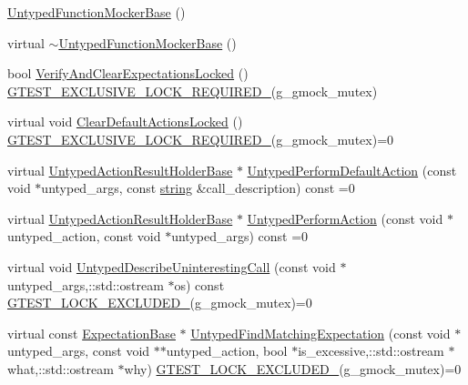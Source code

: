 \begin{DoxyCompactItemize}
\item 
\hyperlink{classtesting_1_1internal_1_1_untyped_function_mocker_base_aedfa95e65d80936e4dff040140513b36}{Untyped\+Function\+Mocker\+Base} ()
\item 
virtual \hyperlink{classtesting_1_1internal_1_1_untyped_function_mocker_base_a6badd47a3fe2a439ef98aa91bf73d721}{$\sim$\+Untyped\+Function\+Mocker\+Base} ()
\item 
bool \hyperlink{classtesting_1_1internal_1_1_untyped_function_mocker_base_a3f1d62a1662a3daa2895b3af963be269}{Verify\+And\+Clear\+Expectations\+Locked} () \hyperlink{gtest-port_8h_a149f693bd59fa1bc937af54c0cdcb32f}{G\+T\+E\+S\+T\+\_\+\+E\+X\+C\+L\+U\+S\+I\+V\+E\+\_\+\+L\+O\+C\+K\+\_\+\+R\+E\+Q\+U\+I\+R\+E\+D\+\_\+}(g\+\_\+gmock\+\_\+mutex)
\item 
virtual void \hyperlink{classtesting_1_1internal_1_1_untyped_function_mocker_base_a40ddd95736946a7951033aa89a7b617f}{Clear\+Default\+Actions\+Locked} () \hyperlink{gtest-port_8h_a149f693bd59fa1bc937af54c0cdcb32f}{G\+T\+E\+S\+T\+\_\+\+E\+X\+C\+L\+U\+S\+I\+V\+E\+\_\+\+L\+O\+C\+K\+\_\+\+R\+E\+Q\+U\+I\+R\+E\+D\+\_\+}(g\+\_\+gmock\+\_\+mutex)=0
\item 
virtual \hyperlink{classtesting_1_1internal_1_1_untyped_action_result_holder_base}{Untyped\+Action\+Result\+Holder\+Base} $\ast$ \hyperlink{classtesting_1_1internal_1_1_untyped_function_mocker_base_a2cb149456cd559d5b0615f2310b235e3}{Untyped\+Perform\+Default\+Action} (const void $\ast$untyped\+\_\+args, const \hyperlink{namespacetesting_1_1internal_a8e8ff5b11e64078831112677156cb111}{string} \&call\+\_\+description) const =0
\item 
virtual \hyperlink{classtesting_1_1internal_1_1_untyped_action_result_holder_base}{Untyped\+Action\+Result\+Holder\+Base} $\ast$ \hyperlink{classtesting_1_1internal_1_1_untyped_function_mocker_base_ada5a72303863d0aa655b66338b8efea5}{Untyped\+Perform\+Action} (const void $\ast$untyped\+\_\+action, const void $\ast$untyped\+\_\+args) const =0
\item 
virtual void \hyperlink{classtesting_1_1internal_1_1_untyped_function_mocker_base_aeb80e61406142e87f94fab10873e20ce}{Untyped\+Describe\+Uninteresting\+Call} (const void $\ast$untyped\+\_\+args,\+::std\+::ostream $\ast$os) const \hyperlink{gtest-port_8h_a69abff5a4efdd07bd5faebe3dd318d06}{G\+T\+E\+S\+T\+\_\+\+L\+O\+C\+K\+\_\+\+E\+X\+C\+L\+U\+D\+E\+D\+\_\+}(g\+\_\+gmock\+\_\+mutex)=0
\item 
virtual const \hyperlink{classtesting_1_1internal_1_1_expectation_base}{Expectation\+Base} $\ast$ \hyperlink{classtesting_1_1internal_1_1_untyped_function_mocker_base_a6461abd05786eee4e125a2695382852d}{Untyped\+Find\+Matching\+Expectation} (const void $\ast$untyped\+\_\+args, const void $\ast$$\ast$untyped\+\_\+action, bool $\ast$is\+\_\+excessive,\+::std\+::ostream $\ast$what,\+::std\+::ostream $\ast$why) \hyperlink{gtest-port_8h_a69abff5a4efdd07bd5faebe3dd318d06}{G\+T\+E\+S\+T\+\_\+\+L\+O\+C\+K\+\_\+\+E\+X\+C\+L\+U\+D\+E\+D\+\_\+}(g\+\_\+gmock\+\_\+mutex)=0
$$
\end{DoxyCompactItemize}
